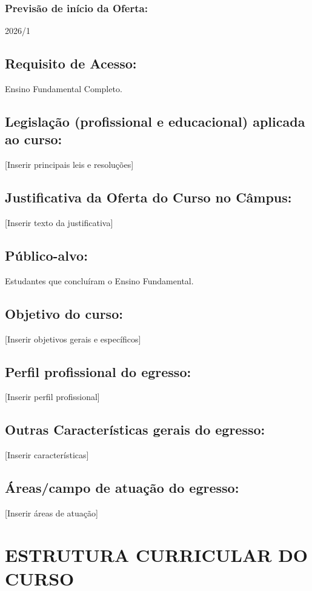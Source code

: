 \documentclass{../../modelos/latex-shared/ifsc-ppc}
\begin{document}
\subsubsection{Previsão de início da Oferta:}
2026/1

\subsection{Requisito de Acesso:}
Ensino Fundamental Completo.

\subsection{Legislação (profissional e educacional) aplicada ao curso:}
[Inserir principais leis e resoluções]

\subsection{Justificativa da Oferta do Curso no Câmpus:}
[Inserir texto da justificativa]

\subsection{Público-alvo:}
Estudantes que concluíram o Ensino Fundamental.

\subsection{Objetivo do curso:}
[Inserir objetivos gerais e específicos]

\subsection{Perfil profissional do egresso:}
[Inserir perfil profissional]

\subsection{Outras Características gerais do egresso:}
[Inserir características]

\subsection{Áreas/campo de atuação do egresso:}
[Inserir áreas de atuação]

\section{ESTRUTURA CURRICULAR DO CURSO}
\end{document}
